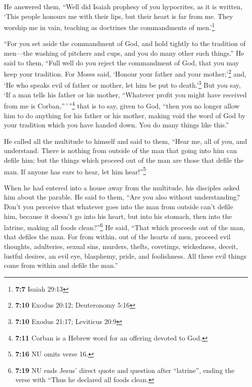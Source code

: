  He answered them, ``Well did Isaiah prophesy of you
hypocrites, as it is written, `This people honours me with their lips,
but their heart is far from me.  They worship me in vain,
teaching as doctrines the commandments of men.'\footnote{\textbf{7:7}
  Isaiah 29:13}

 ``For you set aside the commandment of God, and hold
tightly to the tradition of men---the washing of pitchers and cups, and
you do many other such things.''  He said to them, ``Full
well do you reject the commandment of God, that you may keep your
tradition.  For Moses said, `Honour your father and your
mother;'\footnote{\textbf{7:10} Exodus 20:12; Deuteronomy 5:16} and, `He
who speaks evil of father or mother, let him be put to
death.'\footnote{\textbf{7:10} Exodus 21:17; Leviticus 20:9}
 But you say, `If a man tells his father or his mother,
``Whatever profit you might have received from me is
Corban,''\,'\,''\footnote{\textbf{7:11} Corban is a Hebrew word for an
  offering devoted to God.} that is to say, given to God,
 ``then you no longer allow him to do anything for his
father or his mother,  making void the word of God by
your tradition which you have handed down. You do many things like
this.''

 He called all the multitude to himself and said to them,
``Hear me, all of you, and understand.  There is nothing
from outside of the man that going into him can defile him; but the
things which proceed out of the man are those that defile the man.
 If anyone has ears to hear, let him hear!''\footnote{\textbf{7:16}
  NU omits verse 16.}

 When he had entered into a house away from the
multitude, his disciples asked him about the parable.  He
said to them, ``Are you also without understanding? Don't you perceive
that whatever goes into the man from outside can't defile him,
 because it doesn't go into his heart, but into his
stomach, then into the latrine, making all foods clean?''\footnote{\textbf{7:19}
  NU ends Jesus' direct quote and question after ``latrine'', ending the
  verse with ``Thus he declared all foods clean.}  He
said, ``That which proceeds out of the man, that defiles the man.
 For from within, out of the hearts of men, proceed evil
thoughts, adulteries, sexual sins, murders, thefts, 
covetings, wickedness, deceit, lustful desires, an evil eye, blasphemy,
pride, and foolishness.  All these evil things come from
within and defile the man.''

